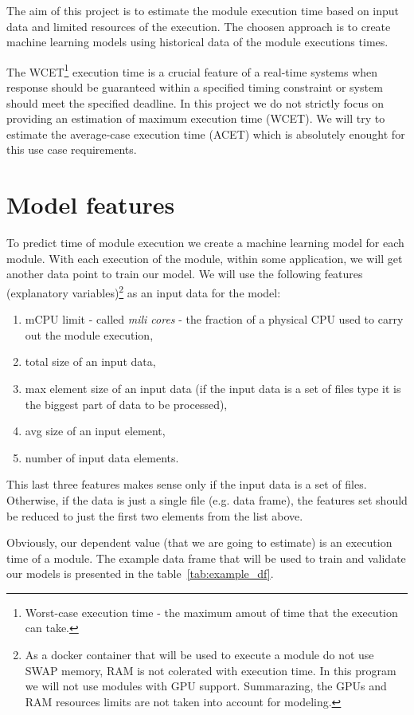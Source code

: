 \documentclass{article}
\begin{document}
	The aim of this project is to estimate the module execution time based on input data and limited resources of the execution. The choosen approach is to create machine learning models using historical data of the module executions times.
	
	The WCET\footnote{Worst-case execution time - the maximum amout of time that the execution can take.} execution time is a crucial feature of a real-time systems\cite{wcet} when response should be guaranteed within a specified timing constraint or system should meet the specified deadline. In this project we do not strictly focus on providing an estimation of maximum execution time (WCET). We will try to estimate the average-case execution time (ACET) which is absolutely enought for this use case requirements.
	\section{Model features}
	To predict time of module execution we create a machine learning model for each module. With each execution of the module, within some application, we will get another data point to train our model. We will use the following features (explanatory variables)\footnote{As a docker container that will be used to execute a module do not use SWAP memory, RAM is not colerated with execution time. In this program we will not use modules with GPU support. Summarazing, the GPUs and RAM resources limits are not taken into account for modeling.} as an input data for the model:
	\begin{enumerate}
		\item mCPU limit - called \textit{mili cores} - the fraction of a physical CPU used to carry out the module execution,
		\item total size of an input data,
		\item max element size of an input data (if the input data is a set of files type it is the biggest part of data to be processed),
		\item avg size of an input element,
		\item number of input data elements.
	\end{enumerate}
	This last three features makes sense only if the input data is a set of files. Otherwise, if the data is just a single file (e.g. data frame), the features set should be reduced to just the first two elements from the list above.
	
	Obviously, our dependent value (that we are going to estimate) is an execution time of a module. The example data frame that will be used to train and validate our models is presented in the table~\ref{tab:example_df}.
	
\end{document}
